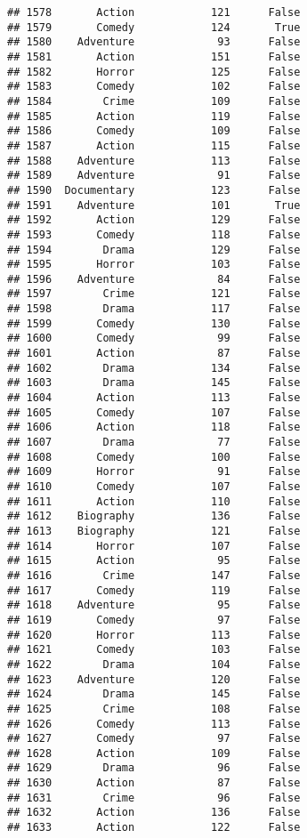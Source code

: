 \documentclass[
]{article}
\begin{document}
\begin{verbatim}
## 1578       Action            121      False
## 1579       Comedy            124       True
## 1580    Adventure             93      False
## 1581       Action            151      False
## 1582       Horror            125      False
## 1583       Comedy            102      False
## 1584        Crime            109      False
## 1585       Action            119      False
## 1586       Comedy            109      False
## 1587       Action            115      False
## 1588    Adventure            113      False
## 1589    Adventure             91      False
## 1590  Documentary            123      False
## 1591    Adventure            101       True
## 1592       Action            129      False
## 1593       Comedy            118      False
## 1594        Drama            129      False
## 1595       Horror            103      False
## 1596    Adventure             84      False
## 1597        Crime            121      False
## 1598        Drama            117      False
## 1599       Comedy            130      False
## 1600       Comedy             99      False
## 1601       Action             87      False
## 1602        Drama            134      False
## 1603        Drama            145      False
## 1604       Action            113      False
## 1605       Comedy            107      False
## 1606       Action            118      False
## 1607        Drama             77      False
## 1608       Comedy            100      False
## 1609       Horror             91      False
## 1610       Comedy            107      False
## 1611       Action            110      False
## 1612    Biography            136      False
## 1613    Biography            121      False
## 1614       Horror            107      False
## 1615       Action             95      False
## 1616        Crime            147      False
## 1617       Comedy            119      False
## 1618    Adventure             95      False
## 1619       Comedy             97      False
## 1620       Horror            113      False
## 1621       Comedy            103      False
## 1622        Drama            104      False
## 1623    Adventure            120      False
## 1624        Drama            145      False
## 1625        Crime            108      False
## 1626       Comedy            113      False
## 1627       Comedy             97      False
## 1628       Action            109      False
## 1629        Drama             96      False
## 1630       Action             87      False
## 1631        Crime             96      False
## 1632       Action            136      False
## 1633       Action            122      False

\end{verbatim}
\end{document}
